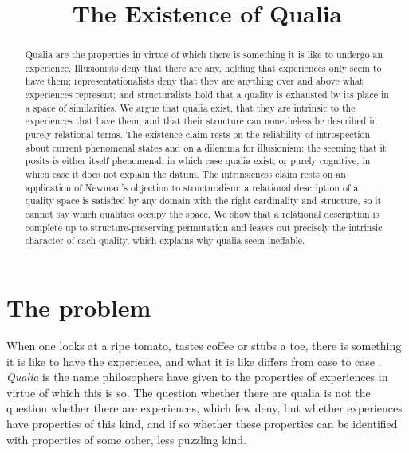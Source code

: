 \documentclass{situationist-preprint}
\title{The Existence of Qualia}
\begin{document}
\maketitle

\begin{abstract}
Qualia are the properties in virtue of which there is something it is like to undergo an experience. Illusionists deny that there are any, holding that experiences only seem to have them; representationalists deny that they are anything over and above what experiences represent; and structuralists hold that a quality is exhausted by its place in a space of similarities. We argue that qualia exist, that they are intrinsic to the experiences that have them, and that their structure can nonetheless be described in purely relational terms. The existence claim rests on the reliability of introspection about current phenomenal states and on a dilemma for illusionism: the seeming that it posits is either itself phenomenal, in which case qualia exist, or purely cognitive, in which case it does not explain the datum. The intrinsicness claim rests on an application of Newman's objection to structuralism: a relational description of a quality space is satisfied by any domain with the right cardinality and structure, so it cannot say which qualities occupy the space. We show that a relational description is complete up to structure-preserving permutation and leaves out precisely the intrinsic character of each quality, which explains why qualia seem ineffable.
\end{abstract}

\section{The problem}

When one looks at a ripe tomato, tastes coffee or stubs a toe, there is something it is like to have the experience, and what it is like differs from case to case \citep{Nagel1974}. \emph{Qualia} is the name philosophers have given to the properties of experiences in virtue of which this is so. The question whether there are qualia is not the question whether there are experiences, which few deny, but whether experiences have properties of this kind, and if so whether these properties can be identified with properties of some other, less puzzling kind.
\end{document}
